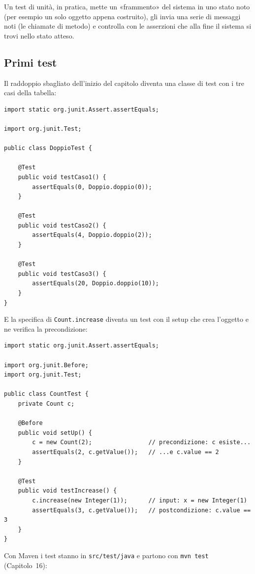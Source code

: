 Un test di unità, in pratica, mette un «frammento» del sistema in uno stato noto (per esempio un solo oggetto appena
costruito), gli invia una serie di messaggi noti (le chiamate di metodo) e controlla con le asserzioni che alla fine il
sistema si trovi nello stato atteso.

\subsection{Primi test}

Il raddoppio sbagliato dell'inizio del capitolo diventa una classe di test con i tre casi della tabella:

\begin{lstlisting}[style=java, name=DoppioTest.java]
import static org.junit.Assert.assertEquals;

import org.junit.Test;

public class DoppioTest {

    @Test
    public void testCaso1() {
        assertEquals(0, Doppio.doppio(0));
    }

    @Test
    public void testCaso2() {
        assertEquals(4, Doppio.doppio(2));
    }

    @Test
    public void testCaso3() {
        assertEquals(20, Doppio.doppio(10));
    }
}
\end{lstlisting}

E la specifica di \texttt{Count.increase} diventa un test con il setup che crea l'oggetto e ne verifica la
precondizione:

\begin{lstlisting}[style=java, name=CountTest.java]
import static org.junit.Assert.assertEquals;

import org.junit.Before;
import org.junit.Test;

public class CountTest {
    private Count c;

    @Before
    public void setUp() {
        c = new Count(2);                // precondizione: c esiste...
        assertEquals(2, c.getValue());   // ...e c.value == 2
    }

    @Test
    public void testIncrease() {
        c.increase(new Integer(1));      // input: x = new Integer(1)
        assertEquals(3, c.getValue());   // postcondizione: c.value == 3
    }
}
\end{lstlisting}

Con Maven i test stanno in \texttt{src/test/java} e partono con \texttt{mvn test} (Capitolo~16):

